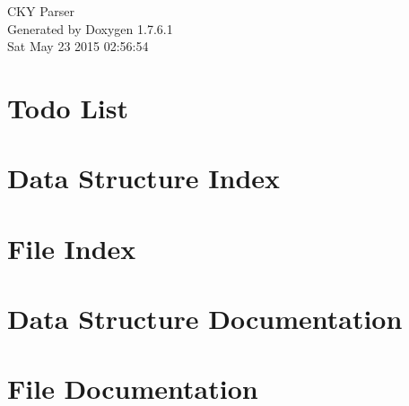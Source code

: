 \documentclass[a4paper]{book}
\begin{document}
\hypersetup{pageanchor=false,citecolor=blue}
\begin{titlepage}
\vspace*{7cm}
\begin{center}
{\Large \-C\-K\-Y \-Parser }\\
\vspace*{1cm}
{\large \-Generated by Doxygen 1.7.6.1}\\
\vspace*{0.5cm}
{\small Sat May 23 2015 02:56:54}\\
\end{center}
\end{titlepage}
\clearemptydoublepage
{}
\tableofcontents
\clearemptydoublepage
{}
\hypersetup{pageanchor=true,citecolor=blue}
\chapter{\-Todo \-List}
\label{todo}
\hypertarget{todo}{}

\chapter{\-Data \-Structure \-Index}

\chapter{\-File \-Index}

\chapter{\-Data \-Structure \-Documentation}








\chapter{\-File \-Documentation}
















\printindex
\end{document}

